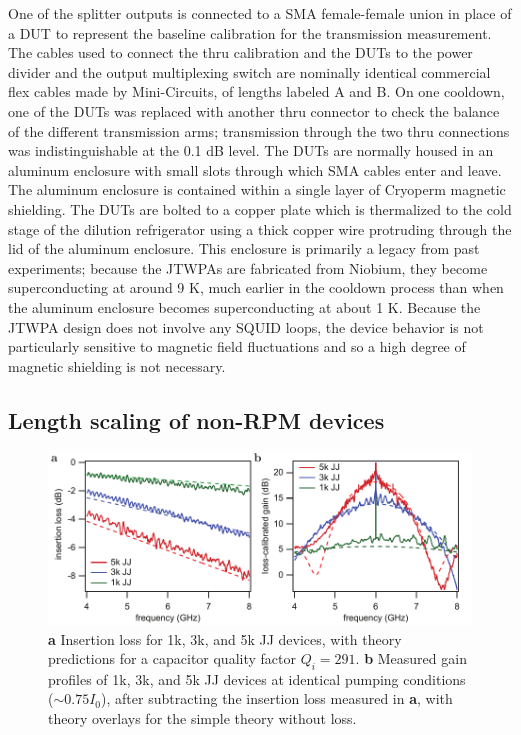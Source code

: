 One of the splitter outputs is connected to a SMA female-female union in place of a DUT to represent the baseline calibration for the transmission measurement.  The cables used to connect the thru calibration and the DUTs to the power divider and the output multiplexing switch are nominally identical commercial flex cables made by Mini-Circuits, of lengths labeled A and B.  On one cooldown, one of the DUTs was replaced with another thru connector to check the balance of the different transmission arms; transmission through the two thru connections was indistinguishable at the 0.1 dB level.  The DUTs are normally housed in an aluminum enclosure with small slots through which SMA cables enter and leave.  The aluminum enclosure is contained within a single layer of Cryoperm magnetic shielding.  The DUTs are bolted to a copper plate which is thermalized to the cold stage of the dilution refrigerator using a thick copper wire protruding through the lid of the aluminum enclosure.  This enclosure is primarily a legacy from past experiments; because the JTWPAs are fabricated from Niobium, they become superconducting at around 9 K, much earlier in the cooldown process than when the aluminum enclosure becomes superconducting at about 1 K.  Because the JTWPA design does not involve any SQUID loops, the device behavior is not particularly sensitive to magnetic field fluctuations and so a high degree of magnetic shielding is not necessary.

\subsection{Length scaling of non-RPM devices}

\begin{figure}
\begin{center}
\includegraphics[width=6in]{twpa_exp/trad_dat}
\end{center}
\caption[Insertion loss and gain of non-RPM JTWPAs]{\textbf{a} Insertion loss for 1k, 3k, and 5k JJ devices, with theory predictions for a capacitor quality factor $Q_i = 291$.  \textbf{b} Measured gain profiles of 1k, 3k, and 5k JJ devices at identical pumping conditions ($\sim 0.75 I_0$), after subtracting the insertion loss measured in \textbf{a}, with theory overlays for the simple theory without loss.}
\label{fig:trad_dat}
\end{figure}

